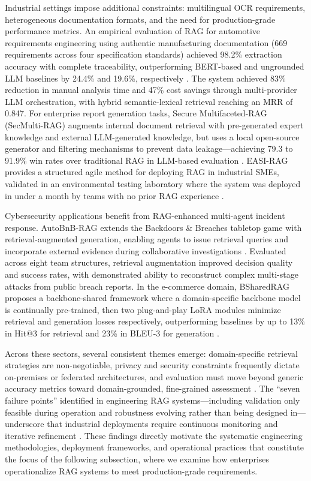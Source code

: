 \documentclass[11pt]{article}
\begin{document}
Industrial settings impose additional constraints: multilingual OCR requirements, heterogeneous documentation formats, and the need for production-grade performance metrics. An empirical evaluation of RAG for automotive requirements engineering using authentic manufacturing documentation (669 requirements across four specification standards) achieved 98.2\% extraction accuracy with complete traceability, outperforming BERT-based and ungrounded LLM baselines by 24.4\% and 19.6\%, respectively \cite{ref567}. The system achieved 83\% reduction in manual analysis time and 47\% cost savings through multi-provider LLM orchestration, with hybrid semantic-lexical retrieval reaching an MRR of 0.847. For enterprise report generation tasks, Secure Multifaceted-RAG (SecMulti-RAG) augments internal document retrieval with pre-generated expert knowledge and external LLM-generated knowledge, but uses a local open-source generator and filtering mechanisms to prevent data leakage---achieving 79.3 to 91.9\% win rates over traditional RAG in LLM-based evaluation \cite{ref505}. EASI-RAG provides a structured agile method for deploying RAG in industrial SMEs, validated in an environmental testing laboratory where the system was deployed in under a month by teams with no prior RAG experience \cite{ref568}.

Cybersecurity applications benefit from RAG-enhanced multi-agent incident response. AutoBnB-RAG extends the Backdoors \& Breaches tabletop game with retrieval-augmented generation, enabling agents to issue retrieval queries and incorporate external evidence during collaborative investigations \cite{ref569}. Evaluated across eight team structures, retrieval augmentation improved decision quality and success rates, with demonstrated ability to reconstruct complex multi-stage attacks from public breach reports. In the e-commerce domain, BSharedRAG proposes a backbone-shared framework where a domain-specific backbone model is continually pre-trained, then two plug-and-play LoRA modules minimize retrieval and generation losses respectively, outperforming baselines by up to 13\% in Hit@3 for retrieval and 23\% in BLEU-3 for generation \cite{ref570}.

Across these sectors, several consistent themes emerge: domain-specific retrieval strategies are non-negotiable, privacy and security constraints frequently dictate on-premises or federated architectures, and evaluation must move beyond generic accuracy metrics toward domain-grounded, fine-grained assessment \cite{ref401,ref571}. The ``seven failure points'' identified in engineering RAG systems---including validation only feasible during operation and robustness evolving rather than being designed in---underscore that industrial deployments require continuous monitoring and iterative refinement \cite{ref572}. These findings directly motivate the systematic engineering methodologies, deployment frameworks, and operational practices that constitute the focus of the following subsection, where we examine how enterprises operationalize RAG systems to meet production-grade requirements.
\end{document}

